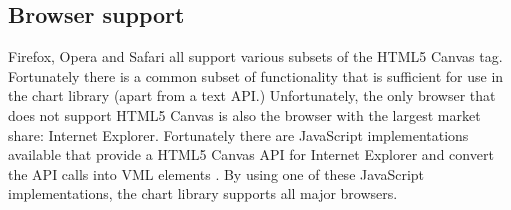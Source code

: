\subsection{Browser support}
Firefox, Opera and Safari all support various subsets of the HTML5 Canvas tag. Fortunately there is a common subset of functionality that is sufficient for use in the chart library (apart from a text API.) Unfortunately, the only browser that does not support HTML5 Canvas is also the browser with the largest market share: Internet Explorer. Fortunately there are JavaScript implementations available that provide a HTML5 Canvas API for Internet Explorer and convert the API calls into VML elements \cite{google08}. By using one of these JavaScript implementations, the chart library supports all major browsers.
